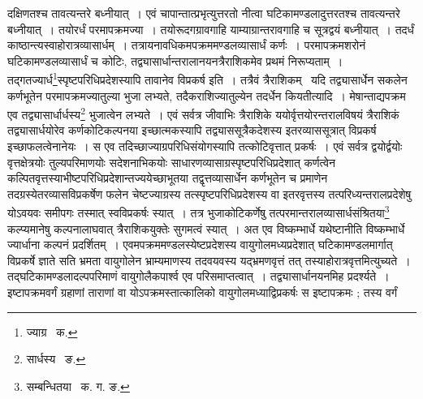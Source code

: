 \documentclass[11pt, openany]{book}
\begin{document}
\noindent दक्षिणतश्च तावत्यन्तरे बध्नीयात्~। एवं चापान्तात्प्रभृत्युत्तरतो नीत्वा घटिकामण्डलादुत्तरतश्च तावत्यन्तरे बध्नीयात्~। तयोरर्धं परमापक्रमज्या~। तयोरूदगग्रावगाहि याम्याग्रान्तरावगाहि च सूत्रद्वयं बध्नीयात्~। तदर्धं काष्ठान्त्यस्वाहोरात्रव्यासार्धम्~। तत्रायनावधिकमपक्रममण्डलव्यासार्धं कर्णः~। परमापक्रमशरोनं घटिकामण्डलव्यासार्धं च कोटिः, तद्व्यासार्धान्तरालानयनत्रैराशिकमेव प्रथमं 
निरूप्यताम्~। तद्गतज्यार्ध\renewcommand{\thefootnote}{१}\footnote{ज्याग्र \textendash\ क.}स्पृष्टपरिधिप्रदेशस्यापि
तावानेव विप्रकर्ष इति~। तत्रैवं त्रैराशिकम् \textendash\ यदि तद्व्यासार्धेन सकलेन कर्णभूतेन परमापक्रमज्यातुल्या भुजा लभ्यते, तदैकराशिज्यातुल्येन तदर्धेन कियतीत्यादि~। मेषान्ताद्यपक्रम एव तद्व्यासार्धार्धस्य\renewcommand{\thefootnote}{२}\footnote{सार्धस्य \textendash\ ङ.} भुजात्वेन लभ्यते~। एवं सर्वत्र जीवाभिः त्रैराशिके ययोर्वृत्तयोरन्तरालविषयं त्रैराशिकं तद्व्यासार्धयोरेव कर्णकोटिकल्पनया इच्छात्मकस्यापि तद्व्याससूत्रैकदेशस्य इतरव्याससूत्रात् विप्रकर्ष इच्छाफलत्वेनानेयः~। स एव तदिच्छाज्याग्रपरिधिसंयोगस्यापि तत्कोटिवृत्तात् प्रकर्षः~। एवं सर्वत्र द्वयोर्द्वयोः वृत्तक्षेत्रयोः तुल्यपरिमाणयोः सदेशनाभिकयोः
साधारणव्यासाग्रस्पृष्टपरिधिप्रदेशात् कर्णत्वेन कल्पितवृत्तस्याभीष्टपरिधिप्रदेशान्तज्ययेच्छाभूतया तद्वृत्तव्यासार्धेन कर्णभूतेन च प्रमाणेन
तदग्रस्येतरव्यासविप्रकर्षेण फलेन चेष्टज्याग्रस्य तत्स्पृष्टपरिधिप्रदेशस्य वा इतरवृत्तस्य तत्परिध्यन्तरालप्रदेशेषु योऽवयवः समीपगः तस्मात् 
स्वविप्रकर्षः स्यात्~। तत्र भुजाकोटिकर्णेषु 
तत्परमान्तरालव्यासार्धसंश्रितया\renewcommand{\thefootnote}{३}\footnote{सम्बन्धितया \textendash\ क. ग. ङ.} कल्प्यमानेषु कल्पनालाघवात् त्रैराशिकयुक्तेः सुगमत्वं स्यात्~। अत एव विष्कम्भार्धे यथेष्टानीति विष्कम्भार्धे ज्यार्धाना कल्पनं प्रदर्शितम्~। एवमपक्रममण्डलस्येष्टप्रदेशस्य वायुगोलमध्यप्रदेशात् घटिकामण्डलमार्गात् विप्रकर्षे ज्ञाते सति भ्रमता वायुगोलेन भ्राम्यमाणस्य तदवयवस्य 
यद्भ्रमणवृत्तं तत् तस्याहोरात्रवृत्तमित्युच्यते~। तद्घटिकामण्डलादल्पपरिमाणं वायुगोलैकपार्श्व एव परिसमाप्तत्वात्~। तद्व्यासार्धानयनमिह प्रदर्श्यते~। इष्टापक्रमवर्गं ग्रहाणां ताराणां वा योऽपक्रमस्तात्कालिको वायुगोलमध्याद्विप्रकर्षः स इष्टापक्रमः ; तस्य वर्गं 

\newpage
\end{document}
